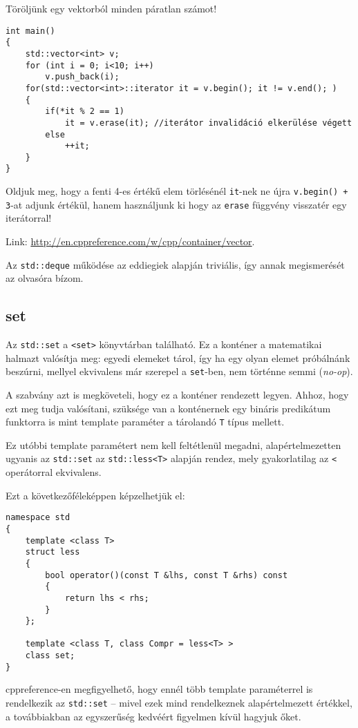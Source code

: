 \documentclass[a4paper,11.5pt,table]{article}
\begin{document}
	\smallskip
	Töröljünk egy vektorból minden páratlan számot!
	\begin{lstlisting}
int main()
{
	std::vector<int> v;
	for (int i = 0; i<10; i++)
		v.push_back(i);
	for(std::vector<int>::iterator it = v.begin(); it != v.end(); )
	{
		if(*it % 2 == 1)
			it = v.erase(it); //iterátor invalidáció elkerülése végett
		else
			++it;
	}
}
	\end{lstlisting}
	\begin{note}
		Oldjuk meg, hogy a fenti 4-es értékű elem törlésénél \texttt{it}-nek ne újra \texttt{v.begin() + 3}-at adjunk értékül, hanem használjunk ki hogy az \texttt{erase} függvény visszatér egy iterátorral!
	\end{note}
	Link: \url{http://en.cppreference.com/w/cpp/container/vector}.
	
	\begin{note}
		Az \texttt{std::deque} működése az eddiegiek alapján triviális, így annak megismerését az olvasóra bízom.
	\end{note}
	\subsection{set}
	
	Az \texttt{std::set} a \texttt{<set>} könyvtárban található. Ez a konténer a matematikai halmazt valósítja meg: egyedi elemeket tárol, így ha egy olyan elemet próbálnánk beszúrni, mellyel ekvivalens már szerepel a \texttt{set}-ben, nem történne semmi (\textit{no-op}). 
	
	A szabvány azt is megköveteli, hogy ez a konténer rendezett legyen. Ahhoz, hogy ezt meg tudja valósítani, szüksége van a konténernek egy bináris predikátum funktorra is mint template paraméter a tárolandó \texttt{T} típus mellett.
	\smallskip
	
	Ez utóbbi template paramétert nem kell feltétlenül megadni, alapértelmezetten ugyanis az \texttt{std::set} az \texttt{std::less<T>} alapján rendez, mely gyakorlatilag az \texttt{<} operátorral ekvivalens.
	\smallskip
	
	Ezt a következőféleképpen képzelhetjük el:
	\begin{lstlisting}
namespace std
{
	template <class T>
	struct less
	{
		bool operator()(const T &lhs, const T &rhs) const
		{
			return lhs < rhs;
		}
	};

	template <class T, class Compr = less<T> >
	class set;
}
	\end{lstlisting}
	\begin{note}
		cppreference-en megfigyelhető, hogy ennél több template paraméterrel is rendelkezik az \texttt{std::set} -- mivel ezek mind rendelkeznek alapértelmezett értékkel, a továbbiakban az egyszerűség kedvéért figyelmen kívül hagyjuk őket.
	\end{note}
	
\end{document}
